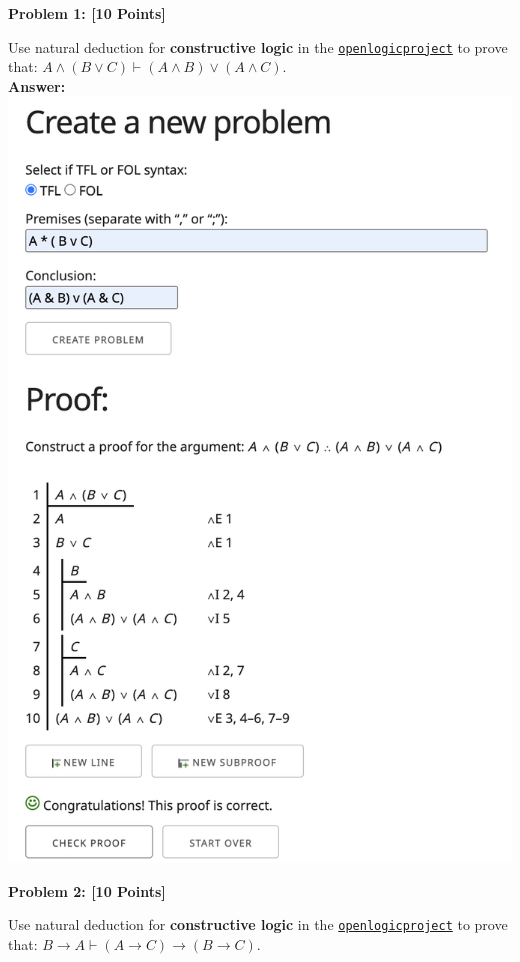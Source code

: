 \documentclass[12pt]{article}
\newcommand{\AND}{\wedge}
\newcommand{\OR}{\vee}
\newcommand{\TURN}{\vdash}
\newcommand{\IMPLIES}{\rightarrow}
\newcommand{\Problem}[3]{\mbox{} \newline \noindent \textbf{\textbf{Problem #1: #2 [#3 Points] \\ }}}
\begin{document}
\Problem{1}{}{10}

Use natural deduction for \textbf{constructive logic}  in the \href{http://proofs.openlogicproject.org}{\texttt{openlogicproject}} to prove  that:  $A \AND (B \OR C) \TURN (A \AND B) \OR (A \AND C)$.\\

\bf{Answer:} 
\includegraphics[scale = 0.4]{hw2pr1.png}

\Problem{2}{}{10}

Use natural deduction for \textbf{constructive logic}  in the \href{http://proofs.openlogicproject.org}{\texttt{openlogicproject}} to prove that:  $B \IMPLIES A \TURN (A \IMPLIES C) \IMPLIES (B \IMPLIES C)$.
\end{document}
